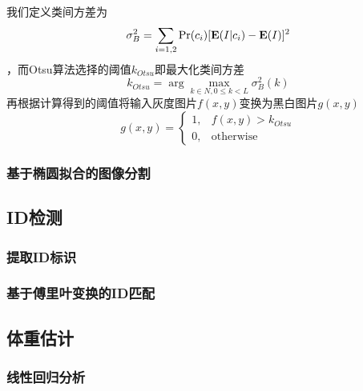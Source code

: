 我们定义类间方差为
\begin{equation}
    \sigma_B^2 = \sum_{i=1,2} \Pr(c_i) [ \mathbf{E}(I|c_i) - \mathbf{E}(I) ]^2
\end{equation}
，而Otsu算法选择的阈值$k_{Otsu}$即最大化类间方差
\begin{equation}
    k_{Otsu} = \arg \max_{k\in N, 0\leq k <L} \sigma_B^2 (k)
\end{equation}
再根据计算得到的阈值将输入灰度图片$f(x,y)$变换为黑白图片$g(x,y)$
\begin{equation}
    g(x,y) = \begin{cases}
        1, & f(x,y) > k_{Otsu} \\
        0, & \text{otherwise}
    \end{cases}
\end{equation}

\subsubsection{基于椭圆拟合的图像分割}


\subsection{ID检测}
\subsubsection{提取ID标识}
\subsubsection{基于傅里叶变换的ID匹配}

\subsection{体重估计}
\subsubsection{线性回归分析}
